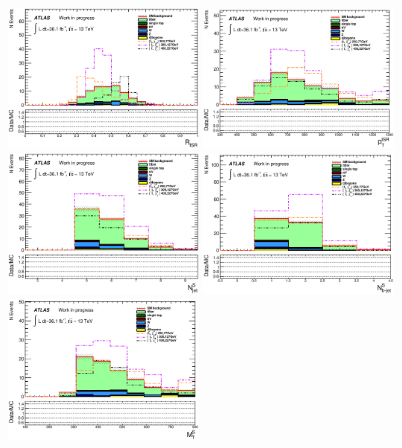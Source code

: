 \begin{figure}[h!]
  \begin{center}
    \includegraphics[width=0.45\textwidth]{figures/plotSR/SR_ND1_RISR_7SR.eps}
    \includegraphics[width=0.45\textwidth]{figures/plotSR/SR_ND1_PTISR_7SR.eps}
    \includegraphics[width=0.45\textwidth]{figures/plotSR/SR_ND1_NjV_7SR.eps}
    \includegraphics[width=0.45\textwidth]{figures/plotSR/SR_NbV_7SR.eps}
    \includegraphics[width=0.45\textwidth]{figures/plotSR/SR_ND1_MS_7SR.eps}

\end{center}
\end{figure}
